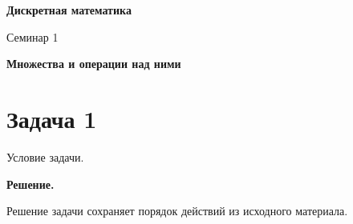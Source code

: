 \documentclass[a4paper,12pt]{article}
\begin{document}
\begin{center}
    {\Large\bfseries Дискретная математика}

    \vspace{0.3em}

    {\large Семинар 1}

    \vspace{0.3em}

    \textbf{Множества и операции над ними}
\end{center}

\vspace{1em}

\section*{Задача 1}

Условие задачи.

\textbf{Решение.}

Решение задачи сохраняет порядок действий из исходного материала.
\end{document}
